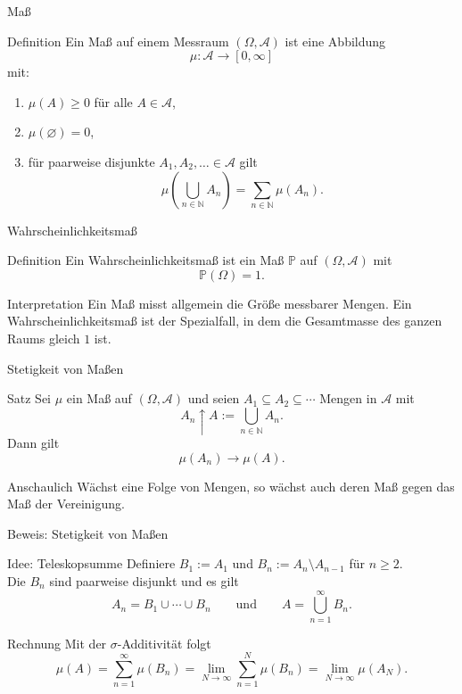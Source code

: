 \documentclass{beamer}
\begin{document}
\begin{frame}{Maß}
\begin{block}{Definition}
Ein Maß auf einem Messraum \((\Omega,\mathcal A)\) ist eine Abbildung
\[
\mu\colon \mathcal A \to [0,\infty]
\]
mit:
\begin{enumerate}
    \item \(\mu(A)\ge 0\) für alle \(A\in\mathcal A\),
    \item \(\mu(\varnothing)=0\),
    \item für paarweise disjunkte \(A_1,A_2,\dots \in \mathcal A\) gilt
    \[
    \mu\!\left(\bigcup_{n\in\mathbb N} A_n\right)
    =
    \sum_{n\in\mathbb N}\mu(A_n).
    \]
\end{enumerate}
\end{block}
\end{frame}

\begin{frame}{Wahrscheinlichkeitsmaß}
\begin{block}{Definition}
Ein Wahrscheinlichkeitsmaß ist ein Maß \(\mathbb P\) auf \((\Omega,\mathcal A)\) mit
\[
\mathbb P(\Omega)=1.
\]
\end{block}

\begin{block}{Interpretation}
Ein Maß misst allgemein die Größe messbarer Mengen.
Ein Wahrscheinlichkeitsmaß ist der Spezialfall, in dem die Gesamtmasse des ganzen Raums gleich \(1\) ist.
\end{block}
\end{frame}

\begin{frame}{Stetigkeit von Maßen}
\begin{block}{Satz}
Sei \(\mu\) ein Maß auf \((\Omega,\mathcal A)\) und seien \(A_1\subseteq A_2\subseteq\cdots\) Mengen in \(\mathcal A\) mit
\[
A_n\uparrow A:=\bigcup_{n\in\mathbb N} A_n.
\]
Dann gilt
\[
\mu(A_n)\to\mu(A).
\]
\end{block}

\begin{block}{Anschaulich}
Wächst eine Folge von Mengen, so wächst auch deren Maß gegen das Maß der Vereinigung.
\end{block}
\end{frame}

\begin{frame}{Beweis: Stetigkeit von Maßen}
\begin{block}{Idee: Teleskopsumme}
Definiere \(B_1:=A_1\) und \(B_n:=A_n\setminus A_{n-1}\) für \(n\ge 2\).
\\[4pt]
Die \(B_n\) sind paarweise disjunkt und es gilt
\[
A_n=B_1\cup\cdots\cup B_n
\qquad\text{und}\qquad
A=\bigcup_{n=1}^\infty B_n.
\]
\end{block}

\begin{block}{Rechnung}
Mit der \(\sigma\)-Additivität folgt
\[
\mu(A)=\sum_{n=1}^\infty\mu(B_n)
=\lim_{N\to\infty}\sum_{n=1}^N\mu(B_n)
=\lim_{N\to\infty}\mu(A_N).
\]
\end{block}
\end{frame}
\end{document}
